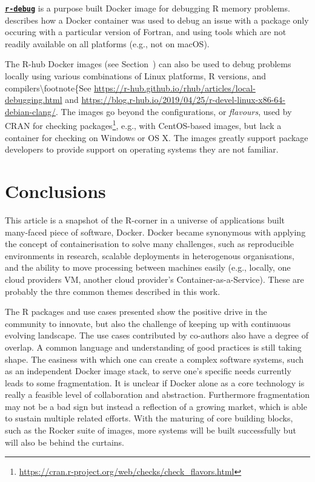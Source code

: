 \textbf{\href{https://github.com/wch/r-debug}{\texttt{r-debug}}} is a
purpose built Docker image for debugging R memory problems.
\citet{eddelbuettel_debugging_2019} describes how a Docker container was
used to debug an issue with a package only occuring with a particular
version of Fortran, and using tools which are not readily available on
all platforms (e.g., not on macOS).

The R-hub Docker images (see Section~) can also be used to
debug problems locally using various combinations of Linux platforms, R
versions, and compilers\textbackslash{}footnote\{See
\href{https://r-hub.github.io/rhub/articles/local-debugging.html}{https://r-hub.github.io/rhub/articles/local-debugging.html}
and
\href{https://blog.r-hub.io/2019/04/25/r-devel-linux-x86-64-debian-clang/}{https://blog.r-hub.io/2019/04/25/r-devel-linux-x86-64-debian-clang/}.
The images go beyond the configurations, or \emph{flavours}, used by
CRAN for checking
packages\footnote{\href{https://cran.r-project.org/web/checks/check_flavors.html}{https://cran.r-project.org/web/checks/check\_flavors.html}},
e.g., with CentOS-based images, but lack a container for checking on
Windows or OS X. The images greatly support package developers to
provide support on operating systems they are not familiar.

\hypertarget{conclusions}{%
\section{Conclusions}\label{conclusions}}

This article is a snapshot of the R-corner in a universe of applications
built many-faced piece of software, Docker. Docker became synonymous
with applying the concept of containerisation to solve many challenges,
such as reproducible environments in research, scalable deployments in
heterogenous organisations, and the ability to move processing between
machines easily (e.g., locally, one cloud providers VM, another cloud
provider's Container-as-a-Service). These are probably the thre common
themes described in this work.

The R packages and use cases presented show the positive drive in the
community to innovate, but also the challenge of keeping up with
continuous evolving landscape. The use cases contributed by co-authors
also have a degree of overlap. A common language and understanding of
good practices is still taking shape. The easiness with which one can
create a complex software systems, such as an independent Docker image
stack, to serve one's specific needs currently leads to some
fragmentation. It is unclear if Docker alone as a core technology is
really a feasible level of collaboration and abstraction. Furthermore
fragmentation may not be a bad sign but instead a reflection of a
growing market, which is able to sustain multiple related efforts. With
the maturing of core building blocks, such as the Rocker suite of
images, more systems will be built successfully but will also be behind
the curtains.

